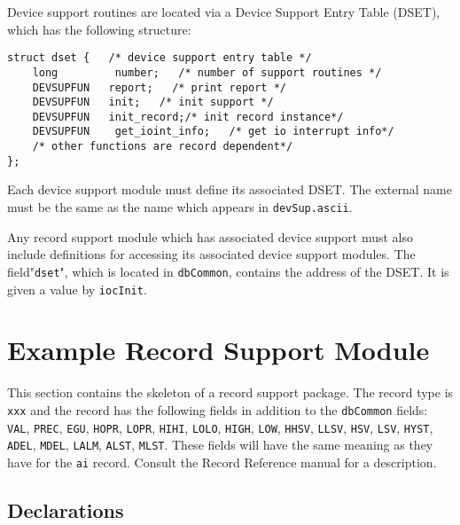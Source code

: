 Device support routines are located via a Device Support Entry Table (DSET), which has the following structure:

\begin{verbatim}
struct dset {   /* device support entry table */
    long         number;   /* number of support routines */
    DEVSUPFUN   report;   /* print report */
    DEVSUPFUN   init;   /* init support */
    DEVSUPFUN   init_record;/* init record instance*/
    DEVSUPFUN    get_ioint_info;   /* get io interrupt info*/
    /* other functions are record dependent*/
};
\end{verbatim}Each device support module must define its associated DSET. The external name must be the same as the name which 
appears in \verb|devSup.ascii|.

Any record support module which has associated device support must also include definitions for accessing its associated 
device support modules. The field"\verb|dset|", which is located in \verb|dbCommon|, contains the address of the DSET. It is given a 
value by \verb|iocInit|.

\section{Example Record Support Module}

This section contains the skeleton of a record support package. The record type is \verb|xxx| and the record has the following 
fields in addition to the \verb|dbCommon| fields: \verb|VAL|, \verb|PREC|, \verb|EGU|, \verb|HOPR|, \verb|LOPR|, \verb|HIHI|, \verb|LOLO|, \verb|HIGH|, \verb|LOW|, \verb|HHSV|, \verb|LLSV|, \verb|HSV|, 
\verb|LSV|, \verb|HYST|, \verb|ADEL|, \verb|MDEL|, \verb|LALM|, \verb|ALST|, \verb|MLST|. These fields will have the same meaning as they have for the \verb|ai| record. 
Consult the Record Reference manual for a description. 

\subsection{Declarations}

